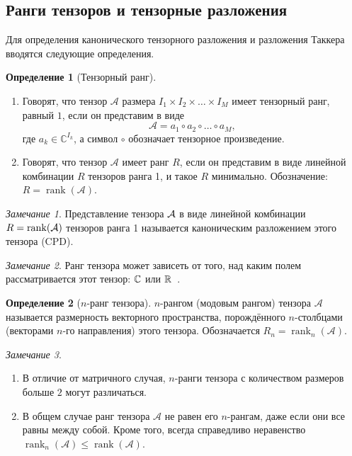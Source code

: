 \documentclass[specialist,
  substylefile=spbu_report.rtx,
subf,href,colorlinks=true, 12pt]{disser}
\theoremstyle{plain}
\theoremstyle{definition}
\newtheorem{definition}{Определение}[section]
\theoremstyle{remark}
\newtheorem{remark}{Замечание}[section]
\begin{document}
\subsection{Ранги тензоров и тензорные разложения}\label{subsec:tensor-ranks}
Для определения канонического тензорного разложения и разложения
Таккера вводятся следующие определения.
\begin{definition}[Тензорный ранг]
  \leavevmode
  \begin{enumerate}
    \item Говорят, что тензор $\mathcal{A}$ размера $I_1\times
      I_2\times \ldots \times I_M$ имеет тензорный ранг, равный $1$,
      если он представим в виде
      \[
        \mathcal{A}=a_1\circ a_2\circ \ldots \circ a_M,
      \]
      где $a_{k} \in \mathbb{C}^{I_k}$, а символ $\circ$ обозначает
      тензорное произведение.
    \item Говорят, что тензор $\mathcal{A}$ имеет ранг $R$, если он
      представим в виде линейной комбинации $R$ тензоров
      ранга 1, и такое $R$ минимально.
      Обозначение: $R=\operatorname{rank}(\mathcal{A})$.
  \end{enumerate}
\end{definition}
\begin{remark}
  Представление тензора $\mathcal{A}$ в виде линейной комбинации
  $R = \operatorname{rank}(\mathcal{A})$ тензоров ранга 1 называется
  каноническим разложением этого тензора (CPD).
\end{remark}

\begin{remark}
  Ранг тензора может зависеть от того, над каким полем
  рассматривается этот тензор:
  $\mathbb{C}$ или $\mathbb{R}$~\cite{tensor-bg}.
\end{remark}

\begin{definition}[$n$-ранг тензора]
  $n$-рангом (модовым рангом) тензора $\mathcal{A}$ называется
  размерность векторного пространства, порождённого
  $n$-столбцами (векторами $n$-го направления) этого тензора.
  Обозначается $R_n=\operatorname{rank}_{n}(\mathcal{A})$.
\end{definition}

\begin{remark}
  \begin{enumerate}
    \item В отличие от матричного случая, $n$-ранги тензора с
      количеством размеров больше $2$ могут различаться.
    \item В общем случае ранг тензора $\mathcal{A}$ не равен его
      $n$-рангам, даже если они все равны между
      собой.
      Кроме того, всегда справедливо неравенство
      $\operatorname{rank}_n(\mathcal{A})\leqslant
      \operatorname{rank}(\mathcal{A})$.
  \end{enumerate}
\end{remark}
\end{document}
